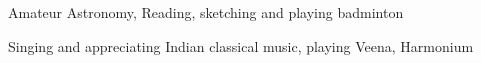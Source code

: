 
\begin{cventries}
\fontsize{9pt}{1em}\bodyfontlight\color{text}
  \begin{cvitems}
    \item Amateur Astronomy, Reading, sketching and playing badminton
    \item Singing and appreciating Indian classical music, playing Veena, Harmonium
  \end{cvitems}
%   
\end{cventries}


